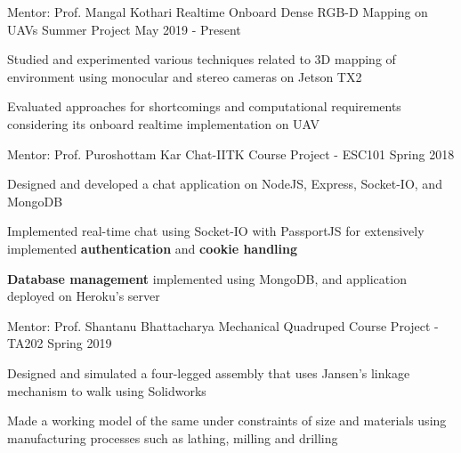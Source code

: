 
\begin{cventries}
  \cventry
    {Mentor: Prof. Mangal Kothari}
    {Realtime Onboard Dense RGB-D Mapping on UAVs}
    {Summer Project}
    {May 2019 - Present}
    {
      \begin{cvitems}
        \item {Studied and experimented various techniques related to 3D mapping of environment using monocular and stereo cameras on Jetson TX2}
        \item {Evaluated approaches for shortcomings and computational requirements considering its onboard realtime implementation on UAV}
      \end{cvitems}
    }

  \cventry
    {Mentor: Prof. Puroshottam Kar}
    {Chat-IITK}
    {Course Project - ESC101}
    {Spring 2018}
    {
      \begin{cvitems}
        \item {Designed and developed a chat application on NodeJS, Express, Socket-IO, and MongoDB}
        \item {Implemented real-time chat using Socket-IO with PassportJS for extensively implemented \textbf{authentication} and \textbf{cookie handling}}
        \item {\textbf{Database management} implemented using MongoDB, and application deployed on Heroku's server}
      \end{cvitems}
    }
  
  \cventry
    {Mentor: Prof. Shantanu Bhattacharya}
    {Mechanical Quadruped}
    {Course Project - TA202}
    {Spring 2019}
    {
      \begin{cvitems}
        \item {Designed and simulated a four-legged assembly that uses Jansen's linkage mechanism to walk using Solidworks}
        \item {Made a working model of the same under constraints of size and materials using manufacturing processes such as lathing, milling and drilling}
      \end{cvitems}
    }
  
\end{cventries}
